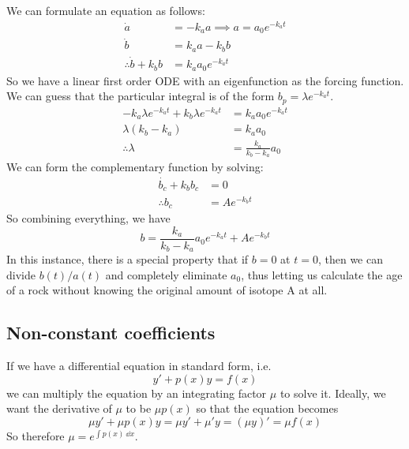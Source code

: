 \noindent We can formulate an equation as follows:
\begin{align*}
	\dot a                    & = -k_a a \implies a = a_0 e^{-k_a t} \\
	\dot b                    & = k_a a - k_b b                      \\
	\therefore \dot b + k_b b & = k_a a_0 e^{-k_a t}
\end{align*}
\noindent So we have a linear first order ODE with an eigenfunction as the forcing function.
We can guess that the particular integral is of the form \(b_p = \lambda e^{-k_a t}\).
\begin{align*}
	-k_a\lambda e^{-k_a t} + k_b \lambda e^{-k_a t} & = k_a a_0 e^{-k_a t}        \\
	\lambda(k_b-k_a)                                & = k_a a_0                   \\
	\therefore \lambda                              & = \frac{k_a}{k_b - k_a} a_0
\end{align*}
We can form the complementary function by solving:
\begin{align*}
	\dot{b_c} + k_b b_c & = 0           \\
	\therefore b_c      & = Ae^{-k_b t}
\end{align*}
So combining everything, we have
\[
	b = \frac{k_a}{k_b - k_a} a_0 e^{-k_a t} + Ae^{-k_b t}
\]
In this instance, there is a special property that if \(b=0\) at \(t=0\), then we can divide \(b(t)/a(t)\) and completely eliminate \(a_0\), thus letting us calculate the age of a rock without knowing the original amount of isotope A at all.

\subsection{Non-constant coefficients}
If we have a differential equation in standard form, i.e.
\[
	y' + p(x)y = f(x)
\]
we can multiply the equation by an integrating factor \(\mu\) to solve it.
Ideally, we want the derivative of \(\mu\) to be \(\mu p(x)\) so that the equation becomes
\[
	\mu y' + \mu p(x) y = \mu y' + \mu' y = (\mu y)' = \mu f(x)
\]
So therefore \(\mu = e^{\int p(x)\ \dd{x}}\).
